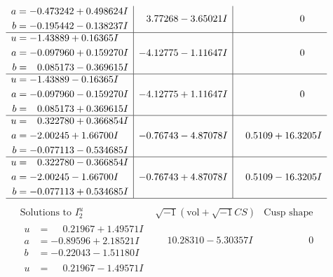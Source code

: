 \documentclass[1p]{elsarticle_modified}
\theoremstyle{definition}
\newcommand{\I}{\sqrt{-1}}
\begin{document}
$$\begin{array}{c|c|c}
\begin{aligned}
a &= -0.473242 + 0.498624 I \\
b &= -0.195442 - 0.138237 I\end{aligned}
 & \phantom{-}3.77268 - 3.65021 I & \phantom{-0.000000 } 0 \\ \hline\begin{aligned}
u &= -1.43889 + 0.16365 I \\
a &= -0.097960 + 0.159270 I \\
b &= \phantom{-}0.085173 - 0.369615 I\end{aligned}
 & -4.12775 - 1.11647 I & \phantom{-0.000000 } 0 \\ \hline\begin{aligned}
u &= -1.43889 - 0.16365 I \\
a &= -0.097960 - 0.159270 I \\
b &= \phantom{-}0.085173 + 0.369615 I\end{aligned}
 & -4.12775 + 1.11647 I & \phantom{-0.000000 } 0 \\ \hline\begin{aligned}
u &= \phantom{-}0.322780 + 0.366854 I \\
a &= -2.00245 + 1.66700 I \\
b &= -0.077113 - 0.534685 I\end{aligned}
 & -0.76743 - 4.87078 I & \phantom{-}0.5109 + 16.3205 I \\ \hline\begin{aligned}
u &= \phantom{-}0.322780 - 0.366854 I \\
a &= -2.00245 - 1.66700 I \\
b &= -0.077113 + 0.534685 I\end{aligned}
 & -0.76743 + 4.87078 I & \phantom{-}0.5109 - 16.3205 I\\
 \hline 
 \end{array}$$\newpage$$\begin{array}{c|c|c}  
\text{Solutions to }I^u_{2}& \I (\text{vol} + \sqrt{-1}CS) & \text{Cusp shape}\\
 \hline 
\begin{aligned}
u &= \phantom{-}0.21967 + 1.49571 I \\
a &= -0.89596 + 2.18521 I \\
b &= -0.22043 - 1.51180 I\end{aligned}
 & \phantom{-}10.28310 - 5.30357 I & \phantom{-0.000000 } 0 \\ \hline\begin{aligned}
u &= \phantom{-}0.21967 - 1.49571 I \\

\end{aligned}
\end{array}$$
\end{document}

